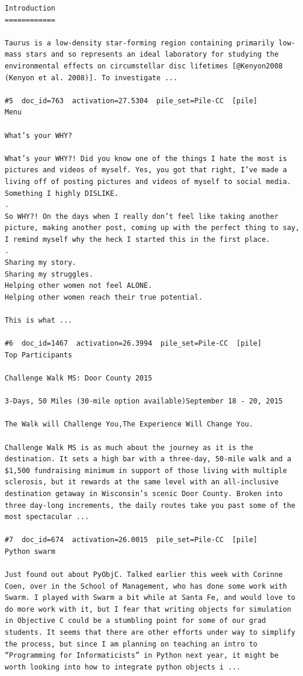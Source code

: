 \begin{verbatim}
Introduction
============

Taurus is a low-density star-forming region containing primarily low-mass stars and so represents an ideal laboratory for studying the environmental effects on circumstellar disc lifetimes [@Kenyon2008 (Kenyon et al. 2008)]. To investigate ...

#5  doc_id=763  activation=27.5304  pile_set=Pile-CC  [pile]
Menu

What’s your WHY?

What’s your WHY?! Did you know one of the things I hate the most is pictures and videos of myself. Yes, you got that right, I’ve made a living off of posting pictures and videos of myself to social media. Something I highly DISLIKE.
.
So WHY?! On the days when I really don’t feel like taking another picture, making another post, coming up with the perfect thing to say, I remind myself why the heck I started this in the first place.
.
Sharing my story.
Sharing my struggles.
Helping other women not feel ALONE.
Helping other women reach their true potential.

This is what ...

#6  doc_id=1467  activation=26.3994  pile_set=Pile-CC  [pile]
Top Participants

Challenge Walk MS: Door County 2015

3-Days, 50 Miles (30-mile option available)September 18 - 20, 2015

The Walk will Challenge You,The Experience Will Change You.

Challenge Walk MS is as much about the journey as it is the destination. It sets a high bar with a three-day, 50-mile walk and a $1,500 fundraising minimum in support of those living with multiple sclerosis, but it rewards at the same level with an all-inclusive destination getaway in Wisconsin’s scenic Door County. Broken into three day-long increments, the daily routes take you past some of the most spectacular ...

#7  doc_id=674  activation=26.0015  pile_set=Pile-CC  [pile]
Python swarm

Just found out about PyObjC. Talked earlier this week with Corinne Coen, over in the School of Management, who has done some work with Swarm. I played with Swarm a bit while at Santa Fe, and would love to do more work with it, but I fear that writing objects for simulation in Objective C could be a stumbling point for some of our grad students. It seems that there are other efforts under way to simplify the process, but since I am planning on teaching an intro to “Programming for Informaticists” in Python next year, it might be worth looking into how to integrate python objects i ...


\end{verbatim}
